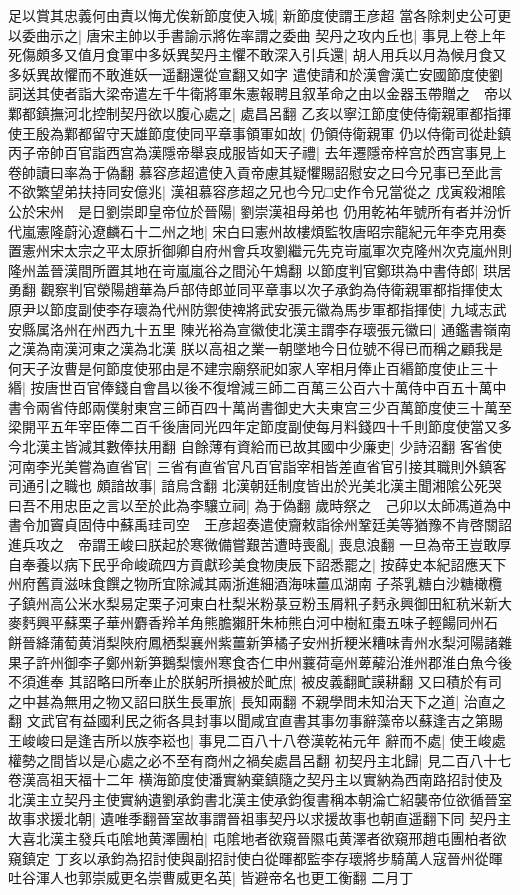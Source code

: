 足以賞其忠義何由責以悔尤俟新節度使入城|{
	新節度使謂王彦超}
當各除刺史公可更以委曲示之|{
	唐宋主帥以手書諭示將佐率謂之委曲}
契丹之攻内丘也|{
	事見上卷上年}
死傷頗多又值月食軍中多妖異契丹主懼不敢深入引兵還|{
	胡人用兵以月為候月食又多妖異故懼而不敢進妖一遥翻還從宣翻又如字}
遣使請和於漢會漢亡安國節度使劉詞送其使者詣大梁帝遣左千牛衛將軍朱憲報聘且叙革命之由以金器玉帶贈之　帝以鄴都鎮撫河北控制契丹欲以腹心處之|{
	處昌呂翻}
乙亥以寧江節度使侍衛親軍都指揮使王殷為鄴都留守天雄節度使同平章事領軍如故|{
	仍領侍衛親軍}
仍以侍衛司從赴鎮　丙子帝帥百官詣西宫為漢隱帝舉哀成服皆如天子禮|{
	去年遷隱帝梓宫於西宫事見上卷帥讀曰率為于偽翻}
慕容彦超遣使入貢帝慮其疑懼賜詔慰安之曰今兄事已至此言不欲繁望弟扶持同安億兆|{
	漢祖慕容彦超之兄也今兄□史作令兄當從之}
戊寅殺湘隂公於宋州　是日劉崇即皇帝位於晉陽|{
	劉崇漢祖母弟也}
仍用乾祐年號所有者并汾忻代嵐憲隆蔚沁遼麟石十二州之地|{
	宋白曰憲州故樓煩監牧唐昭宗龍紀元年李克用奏置憲州宋太宗之平太原折御卿自府州會兵攻劉繼元先克岢嵐軍次克隆州次克嵐州則隆州盖晉漢間所置其地在岢嵐嵐谷之間沁午鴆翻}
以節度判官鄭珙為中書侍郎|{
	珙居勇翻}
觀察判官滎陽趙華為戶部侍郎並同平章事以次子承鈞為侍衛親軍都指揮使太原尹以節度副使李存瓌為代州防禦使禆將武安張元徽為馬步軍都指揮使|{
	九域志武安縣属洛州在州西九十五里}
陳光裕為宣徽使北漢主謂李存瓌張元徽曰|{
	通鑑書嶺南之漢為南漢河東之漢為北漢}
朕以高祖之業一朝墜地今日位號不得已而稱之顧我是何天子汝曹是何節度使邪由是不建宗廟祭祀如家人宰相月俸止百緡節度使止三十緡|{
	按唐世百官俸錢自會昌以後不復增減三師二百萬三公百六十萬侍中百五十萬中書令兩省侍郎兩僕射東宫三師百四十萬尚書御史大夫東宫三少百萬節度使三十萬至梁開平五年宰臣俸二百千後唐同光四年定節度副使每月料錢四十千則節度使當又多今北漢主皆減其數俸扶用翻}
自餘薄有資給而已故其國中少廉吏|{
	少詩沼翻}
客省使河南李光美嘗為直省官|{
	三省有直省官凡百官詣宰相皆差直省官引接其職則外鎮客司通引之職也}
頗諳故事|{
	諳烏含翻}
北漢朝廷制度皆出於光美北漢主聞湘隂公死哭曰吾不用忠臣之言以至於此為李驤立祠|{
	為于偽翻}
歲時祭之　己卯以太師馮道為中書令加竇貞固侍中蘇禹珪司空　王彦超奏遣使齎敕詣徐州鞏廷美等猶豫不肯啓關詔進兵攻之　帝謂王峻曰朕起於寒微備嘗艱苦遭時喪亂|{
	喪息浪翻}
一旦為帝王豈敢厚自奉養以病下民乎命峻疏四方貢獻珍美食物庚辰下詔悉罷之|{
	按薛史本紀詔應天下州府舊貢滋味食饌之物所宜除減其兩浙進細酒海味薑瓜湖南子茶乳糖白沙糖橄欖子鎮州高公米水梨易定栗子河東白杜梨米粉菉豆粉玉屑籸子麫永興御田紅秔米新大麥麫興平蘇栗子華州麝香羚羊角熊膽獺肝朱柿熊白河中樹紅棗五味子輕餳同州石餅晉絳蒲萄黄消梨陜府鳳栖梨襄州紫薑新笋橘子安州折粳米糟味青州水梨河陽諸雜果子許州御李子鄭州新笋鵝梨懷州寒食杏仁申州蘘荷亳州萆薢沿淮州郡淮白魚今後不須進奉}
其詔略曰所奉止於朕躬所損被於甿庶|{
	被皮義翻甿謨耕翻}
又曰積於有司之中甚為無用之物又詔曰朕生長軍旅|{
	長知兩翻}
不親學問未知治天下之道|{
	治直之翻}
文武官有益國利民之術各具封事以聞咸宜直書其事勿事辭藻帝以蘇逢吉之第賜王峻峻曰是逢吉所以族李崧也|{
	事見二百八十八卷漢乾祐元年}
辭而不處|{
	使王峻處權勢之間皆以是心處之必不至有商州之禍矣處昌呂翻}
初契丹主北歸|{
	見二百八十七卷漢高祖天福十二年}
横海節度使潘實納棄鎮隨之契丹主以實納為西南路招討使及北漢主立契丹主使實納遺劉承鈞書北漢主使承鈞復書稱本朝淪亡紹襲帝位欲循晉室故事求援北朝|{
	遺唯季翻晉室故事謂晉祖事契丹以求援故事也朝直遥翻下同}
契丹主大喜北漢主發兵屯隂地黄澤團柏|{
	屯隂地者欲窺晉隰屯黄澤者欲窺邢趙屯團柏者欲窺鎮定}
丁亥以承鈞為招討使與副招討使白從暉都監李存瓌將步騎萬人寇晉州從暉吐谷渾人也郭崇威更名崇曹威更名英|{
	皆避帝名也更工衡翻}
二月丁

